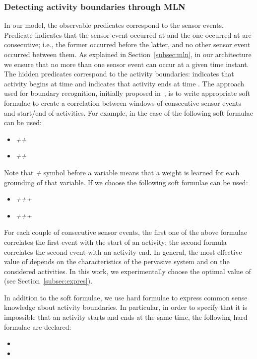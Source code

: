 \documentclass[10pt, conference, compsocconf]{IEEEtran}
\begin{document}
 \subsubsection{Detecting activity boundaries through MLN}
\label{subsubsec:detection}
In our model, the observable predicates correspond to the sensor events. 
Predicate  indicates that the sensor event occurred at  and the one occurred at  are consecutive; i.e., the former occurred before the latter, and no other sensor event occurred between them. 
As explained in Section~\ref{subsec:mln}, in our architecture we ensure that no more than one sensor event can occur at a given time instant.
The hidden predicates correspond to the activity boundaries:  indicates that activity  begins at time  and  indicates that activity  ends at time . 
The approach used for boundary recognition, initially proposed in~\cite{Helaoui2011}, is to write appropriate soft formulae to create a correlation between windows of  consecutive sensor events and start/end of activities. For example, in the case of  the following soft formulae can be used:
\begin{itemize}
\item \textit{+}\textit{+}
\item \textit{+}\textit{+}
\end{itemize}
Note that \textit{+} symbol before a variable means that a weight is learned for each grounding of that variable.
If we choose  the following soft formulae can be used:
\begin{itemize}
\item \textit{+}\textit{+}\textit{+}
\item \textit{+}\textit{+}\textit{+}
\end{itemize}
For each couple of consecutive sensor events, the first one of the above formulae correlates the first event with the start of an activity; the second formula correlates the second event with an activity end.
In general, the most effective value of  depends on the characteristics of the pervasive system and on the considered activities. In this work, we experimentally choose the optimal value of  (see Section~\ref{subsec:expres}). 

In addition to the soft formulae, we use hard formulae to express common sense knowledge about activity boundaries. In particular, in order to specify that it is impossible that an activity starts and ends at the same time, the following hard formulae are declared: 
\begin{itemize}
\item 
\item 
\end{itemize}
\end{document}
